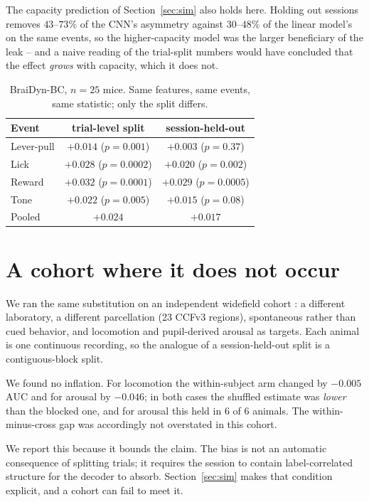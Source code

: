 \documentclass{article}
\newcommand{\auc}{\mathrm{AUC}}
\begin{document}
The capacity prediction of Section~\ref{sec:sim} also holds here. Holding out sessions removes
$43$--$73\%$ of the CNN's asymmetry against $30$--$48\%$ of the linear model's on the same events, so
the higher-capacity model was the larger beneficiary of the leak -- and a naive reading of the
trial-split numbers would have concluded that the effect \emph{grows} with capacity, which it does
not.

\begin{table}[t]\centering
\caption{BraiDyn-BC, $n = 25$ mice. Same features, same events, same statistic; only the split
differs.}
\label{tab:braidyn}
\begin{tabular}{lcc}
\toprule
Event & trial-level split & session-held-out \\
\midrule
Lever-pull & $+0.014$ ($p = 0.001$) & $+0.003$ ($p = 0.37$) \\
Lick       & $+0.028$ ($p = 0.0002$) & $+0.020$ ($p = 0.002$) \\
Reward     & $+0.032$ ($p = 0.0001$) & $+0.029$ ($p = 0.0005$) \\
Tone       & $+0.022$ ($p = 0.005$) & $+0.015$ ($p = 0.08$) \\
\midrule
Pooled     & $+0.024$ & $+0.017$ \\
\bottomrule
\end{tabular}
\end{table}

\section{A cohort where it does not occur}
\label{sec:cardin}
We ran the same substitution on an independent widefield cohort \citep{benisty2024}: a different
laboratory, a different parcellation (23 CCFv3 regions), spontaneous rather than cued behavior, and
locomotion and pupil-derived arousal as targets. Each animal is one continuous recording, so the
analogue of a session-held-out split is a contiguous-block split.

We found no inflation. For locomotion the within-subject arm changed by $-0.005$ $\auc$ and for
arousal by $-0.046$; in both cases the shuffled estimate was \emph{lower} than the blocked one, and
for arousal this held in $6$ of $6$ animals. The within-minus-cross gap was accordingly not
overstated in this cohort.

We report this because it bounds the claim. The bias is not an automatic consequence of splitting
trials; it requires the session to contain label-correlated structure for the decoder to absorb.
Section~\ref{sec:sim} makes that condition explicit, and a cohort can fail to meet it.
\end{document}
